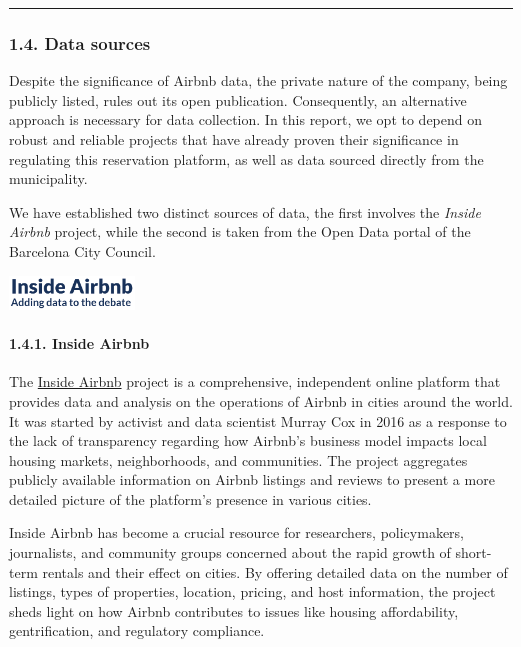 \documentclass[
]{article}
\begin{document}
\begin{center}\rule{0.5\linewidth}{0.5pt}\end{center}

\hypertarget{data-sources}{%
\subsubsection{1.4. Data sources}\label{data-sources}}

Despite the significance of Airbnb data, the private nature of the
company, being publicly listed, rules out its open publication.
Consequently, an alternative approach is necessary for data collection.
In this report, we opt to depend on robust and reliable projects that
have already proven their significance in regulating this reservation
platform, as well as data sourced directly from the municipality.

We have established two distinct sources of data, the first involves the
\emph{Inside Airbnb} project, while the second is taken from the Open
Data portal of the Barcelona City Council.

\includegraphics[width=0.25\textwidth,height=\textheight]{Assets/InsideAirbnb.png}

\hypertarget{inside-airbnb}{%
\paragraph{1.4.1. Inside Airbnb}\label{inside-airbnb}}

The \href{http://insideairbnb.com/}{Inside Airbnb} project is a
comprehensive, independent online platform that provides data and
analysis on the operations of Airbnb in cities around the world. It was
started by activist and data scientist Murray Cox in 2016 as a response
to the lack of transparency regarding how Airbnb's business model
impacts local housing markets, neighborhoods, and communities. The
project aggregates publicly available information on Airbnb listings and
reviews to present a more detailed picture of the platform's presence in
various cities.

Inside Airbnb has become a crucial resource for researchers,
policymakers, journalists, and community groups concerned about the
rapid growth of short-term rentals and their effect on cities. By
offering detailed data on the number of listings, types of properties,
location, pricing, and host information, the project sheds light on how
Airbnb contributes to issues like housing affordability, gentrification,
and regulatory compliance.
\end{document}
